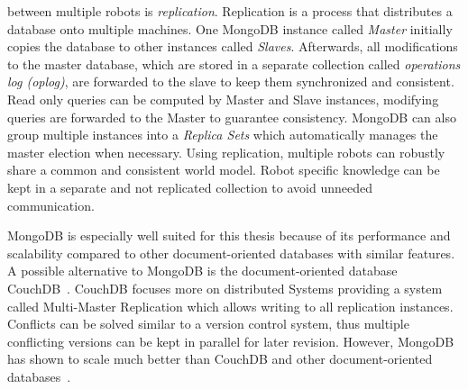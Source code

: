 \documentclass[a4paper,11pt]{article}
\begin{document}
between multiple robots is \emph{replication}. Replication is a
process that distributes a database onto multiple machines.
One MongoDB instance called \emph{Master} initially
copies the database  to other instances called \emph{Slaves}.
Afterwards, all modifications to the master database, which are
stored in a separate collection called \emph{operations log (oplog)}, are forwarded to
the slave to keep them synchronized and consistent.
Read only queries can be
computed by Master and Slave instances, modifying queries are
forwarded to the Master to guarantee consistency.
MongoDB can also group multiple
instances into a \emph{Replica Sets} which automatically manages
the master election when necessary.  Using replication,
multiple robots can robustly share a common and consistent world
model. Robot specific knowledge can be kept in a separate and not
replicated collection to avoid unneeded communication.

MongoDB is especially well suited for this thesis because of its
performance and scalability compared to other document-oriented
databases with similar features. A possible alternative to MongoDB is
the document-oriented database CouchDB~\cite{CouchDB}. CouchDB
focuses more on distributed Systems providing a system called
Multi-Master Replication which allows writing to all replication instances.
Conflicts can be solved similar to a version
control system, thus multiple conflicting versions can be kept in
parallel for later revision. However, MongoDB has shown to scale much
better than CouchDB and other document-oriented databases~\cite{db-comparison}.
\end{document}
